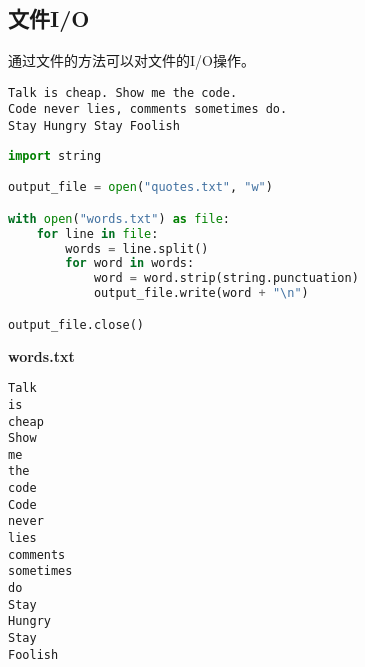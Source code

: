 \subsection{文件I/O}

通过文件的方法可以对文件的I/O操作。\\

\begin{table}[H]
    \centering
    \caption{文件I/O}
\end{table}

\vspace{0.5cm}


\begin{lstlisting}[title=quotes.txt]
Talk is cheap. Show me the code.
Code never lies, comments sometimes do.
Stay Hungry Stay Foolish
\end{lstlisting}

\begin{lstlisting}[language=Python]
import string

output_file = open("quotes.txt", "w")

with open("words.txt") as file:
    for line in file:
        words = line.split()
        for word in words:
            word = word.strip(string.punctuation)
            output_file.write(word + "\n")

output_file.close()
\end{lstlisting}

\begin{tcolorbox}
    \textbf{words.txt}
    \begin{verbatim}
Talk
is
cheap
Show
me
the
code
Code
never
lies
comments
sometimes
do
Stay
Hungry
Stay
Foolish
	\end{verbatim}
\end{tcolorbox}

